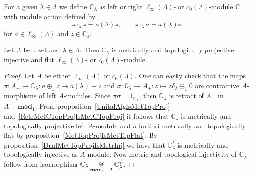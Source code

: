 For a given $\lambda\in\Lambda$ we define $\mathbb{C}_\lambda$ as left or right
$\ell_\infty(\Lambda)$- or $c_0(\Lambda)$-module $\mathbb{C}$ with module action
defined by
$$
a\cdot_\lambda z=a(\lambda)z,\qquad z\cdot_\lambda a=a(\lambda) z.
$$
for $a\in \ell_\infty(\Lambda)$ and $z\in\mathbb{C}_s$. 

\begin{proposition}\label{OneDimlInftyc0ModMetTopProjIngFlat} Let $\Lambda$ be a
set and $\lambda\in\Lambda$. Then $\mathbb{C}_\lambda$ is metrically and
topologically projective injective and flat $\ell_\infty(\Lambda)$- or
$c_0(\Lambda)$-module.
\end{proposition}
\begin{proof} Let $A$ be either $\ell_\infty(\Lambda)$ or $c_0(\Lambda)$. One
can easily check that the 
maps $\pi:A_+\to\mathbb{C}_\lambda:a\oplus_1 z\mapsto a(\lambda)+z$ 
and $\sigma:\mathbb{C}_\lambda\to A_+:z\mapsto z\delta_\lambda\oplus_1 0$ 
are contractive $A$-morphisms of left $A$-modules.
Since $\pi\sigma=1_{\mathbb{C}_\lambda}$, then $\mathbb{C}_\lambda$ is retract
of $A_+$ in $A-\mathbf{mod}_1$. From proposition~\ref{UnitalAlgIsMetTopProj}
and~\ref{RetrMetCTopProjIsMetCTopProj} it follows that $\mathbb{C}_\lambda$ is
metrically and topologically projective left $A$-module and a fortiori
metrically and topologically flat by proposition~\ref{MetTopProjIsMetTopFlat}.
By proposition~\ref{DualMetTopProjIsMetrInj} we have that $\mathbb{C}_\lambda^*$
is metrically and topologically injective as $A$-module. Now metric and
topological injectivity of $\mathbb{C}_\lambda$ follow from isomorphism
$\mathbb{C}_\lambda\mathop{\mathbin{\cong}}\limits_{\mathbf{mod}_1-A}\mathbb{C}_\lambda^*$.
\end{proof}

